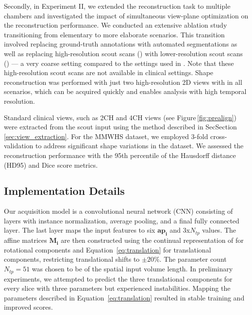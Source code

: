     Secondly, in Experiment II, we extended the reconstruction task to multiple chambers and investigated the impact of simultaneous view-plane optimization on the reconstruction performance. We conducted an extensive ablation study transitioning from elementary to more elaborate scenarios. This transition involved replacing ground-truth annotations with automated segmentations as well as replacing high-resolution scout scans ()
    with lower-resolution scout scans () --- a very coarse setting compared to the settings used in \cite{kellman2011automatic}. Note that these high-resolution scout scans are not available in clinical settings.
    Shape reconstruction was performed with just two high-resolution 2D views with  in all scenarios, which can be acquired quickly and enables analysis with high temporal resolution.

    Standard clinical views, such as 2CH and 4CH views (see Figure\,\ref{fig:prealign}) were extracted from the scout input using the method described in SecSection\,\ref{sec:view_extraction}.
    For the MMWHS dataset, we employed 3-fold cross-validation to address significant shape variations in the dataset. We assessed the reconstruction performance with the 95th percentile of the Hausdorff distance (HD95) and Dice score metrics.

    \subsection{Implementation Details}
    \label{sec:implementation}
     Our acquisition model is a convolutional neural network (CNN) consisting of layers with instance normalization, average pooling, and a final fully connected layer. The last layer maps the input features to six $\mathbf{ap_i}$ and 3x$N_{tp}$  values.
    The affine matrices $\mathbf{M_i}$ are then constructed using the continual representation of \cite{zhou2019continuity} for rotational components and Equation \,\eqref{eq:translation} for translational components, restricting translational shifts to $\pm20\%$.
    The parameter count $N_{tp}=51$ was chosen to be  of the spatial input volume length.
    In preliminary experiments, we attempted to predict the three translational components for every slice with three parameters but experienced instabilities. Mapping the parameters described in Equation \,\eqref{eq:translation} resulted in stable training and improved scores.


